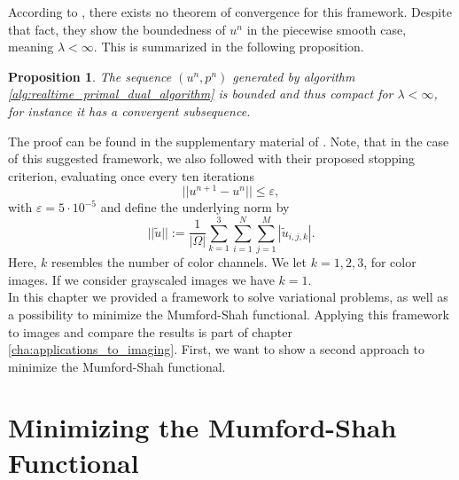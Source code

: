 \documentclass{scrreprt}
\newtheorem{proposition}[theorem]{Proposition}
\begin{document}
            According to \cite{Strekalovskiy-Cremers-eccv14}, there exists no theorem of convergence for this framework. Despite that fact, they show the boundedness of $u^{n}$ in the piecewise smooth case, meaning $\lambda < \infty$. This is summarized in the following proposition.
            \begin{proposition}
                The sequence $(u^{n}, p^{n})$ generated by algorithm \ref{alg:realtime_primal_dual_algorithm} is bounded and thus compact for $\lambda < \infty$, for instance it has a convergent subsequence.
            \end{proposition}

            The proof can be found in the supplementary material of \cite{Strekalovskiy-Cremers-eccv14}. Note, that in the case of this suggested framework, we also followed \cite{Strekalovskiy-Cremers-eccv14} with their proposed stopping criterion, evaluating once every ten iterations
                \begin{equation}
                    ||u^{n+1} - u^{n}|| \le \varepsilon,
                    \label{eq:stop_realtime_model}
                \end{equation}
            with $\varepsilon = 5 \cdot 10^{-5}$ and define the underlying norm by
                $$
                    ||\tilde{u}|| := \frac{1}{|\Omega|} \sum_{k = 1}^{3} \sum_{i = 1}^{N} \sum_{j = 1}^{M} |\tilde{u}_{i,j,k}|.
                $$
            Here, $k$ resembles the number of color channels. We let $k = 1, 2, 3$, for color images. If we consider grayscaled images we have $k = 1$.\\



    In this chapter we provided a framework to solve variational problems, as well as a possibility to minimize the Mumford-Shah functional. Applying this framework to images and compare the results is part of chapter \ref{cha:applications_to_imaging}. First, we want to show a second approach to minimize the Mumford-Shah functional.


\chapter{Minimizing the Mumford-Shah Functional} %
\label{cha:minimizing_the_mumford_shah_functional}
\end{document}
